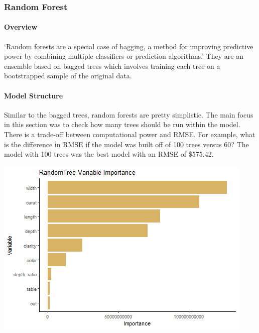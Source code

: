 \documentclass[
  paper=a4,
  ,captions=tableheading
]{scrartcl}
\begin{document}
\hypertarget{random-forest}{%
\subsubsection{Random Forest}\label{random-forest}}

\hypertarget{overview-3}{%
\paragraph{Overview}\label{overview-3}}

`Random forests are a special case of bagging, a method for improving
predictive power by combining multiple classifiers or prediction
algorithms.' They are an ensemble based on bagged trees which involves
training each tree on a bootstrapped sample of the original data.

\hypertarget{model-structure-1}{%
\paragraph{Model Structure}\label{model-structure-1}}

Similar to the bagged trees, random forests are pretty simplistic. The
main focus in this section was to check how many trees should be run
within the model. There is a trade-off between computational power and
RMSE. For example, what is the difference in RMSE if the model was built
off of 100 trees versus 60? The model with 100 trees was the best model
with an RMSE of \$575.42.

\begin{center}\includegraphics{Diamonds_PDF_files/figure-latex/RF Variable Importance-1} \end{center}
\end{document}
